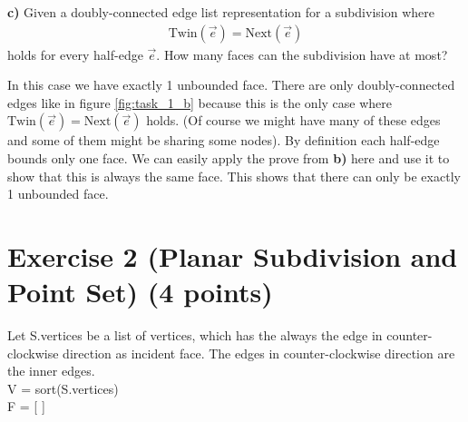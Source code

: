\documentclass[english, fontsize=12pt, paper=a4, twoside=false, draft=true, pagesize=auto, version=last, DIV=16]{scrartcl}
\theoremstyle{break}
\begin{document}
\textbf{c)} Given a doubly-connected edge list representation for a subdivision where
\begin{align*}
\text{Twin}(\vec{e}) = \text{Next}(\vec{e})
\end{align*} 
holds for every half-edge $\vec{e}$. How many faces can the subdivision have at most? \par
\medskip
In this case we have exactly 1 unbounded face. There are only doubly-connected edges like in figure \ref{fig:task_1_b} because this is the only case where $\text{Twin}(\vec{e}) = \text{Next}(\vec{e})$ holds. (Of course we might have many of these edges and some of them might be sharing some nodes). By definition each half-edge bounds only one face. We can easily apply the prove from \textbf{b)} here and use it to show that this is always the same face. This shows that there can only be exactly 1 unbounded face.

\vspace*{10mm}
\newpage




\section*{Exercise 2 (Planar Subdivision and Point Set) {\large \hfill (4 points)}}

Let S.vertices be a list of vertices, which has the always the edge in counter-clockwise direction as incident face. The edges in counter-clockwise direction are the inner edges.\\

V = sort(S.vertices)\\
F = [ ]\\
\end{document}
